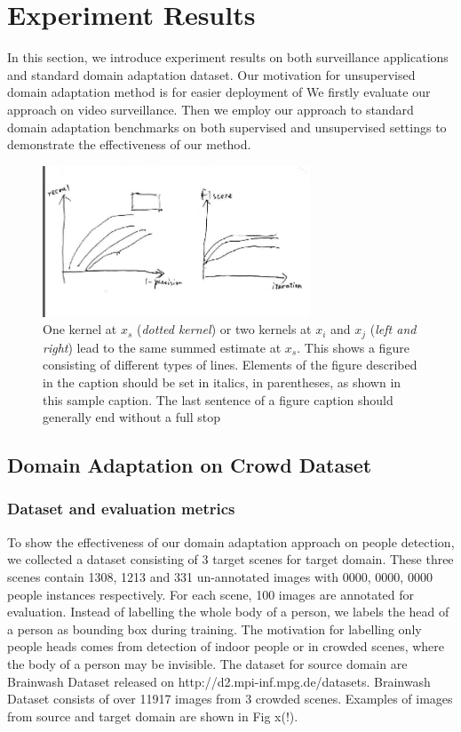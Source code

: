 \documentclass[runningheads]{llncs}
\begin{document}
\section{Experiment Results}
\label{section:Experiment Results}

In this section, we introduce experiment results on both surveillance applications and standard domain adaptation dataset. Our motivation for unsupervised domain adaptation method is for easier deployment of  We firstly evaluate our approach on video surveillance. Then we employ our approach to standard domain adaptation benchmarks on both supervised and unsupervised settings to demonstrate the effectiveness of our method.

\begin{figure}
\centering
\includegraphics[height=4.5cm]{images/precisionrecall.png}
\caption{One kernel at $x_s$ ({\it dotted kernel}) or two kernels at
$x_i$ and $x_j$ ({\it left and right}) lead to the same summed estimate
at $x_s$. This shows a figure consisting of different types of
lines. Elements of the figure described in the caption should be set in
italics,
in parentheses, as shown in this sample caption. The last
sentence of a figure caption should generally end without a full stop}
\label{fig:example}
\end{figure}

\subsection{Domain Adaptation on Crowd Dataset}

\subsubsection{Dataset and evaluation metrics}
To show the effectiveness of our domain adaptation approach on people detection, we collected a dataset consisting of 3 target scenes for target domain. These three scenes contain 1308, 1213 and 331 un-annotated images with 0000, 0000, 0000 people instances respectively. For each scene, 100 images are annotated for evaluation. Instead of labelling the whole body of a person, we labels the head of a person as bounding box during training. The motivation for labelling only people heads comes from detection of indoor people or in crowded scenes, where the body of a person may be invisible. The dataset for source domain are Brainwash Dataset released on http://d2.mpi-inf.mpg.de/datasets. Brainwash Dataset consists of over 11917 images from 3 crowded scenes. Examples of images from source and target domain are shown in Fig x(!).
\end{document}
